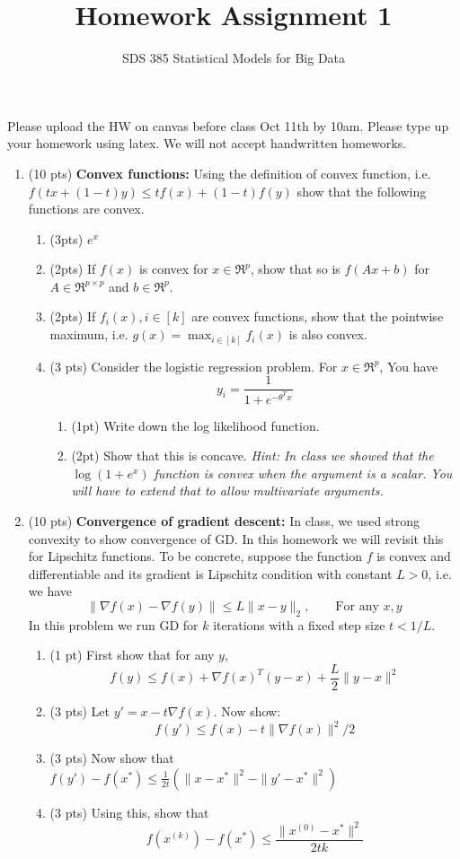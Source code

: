 \documentclass[11pt]{article}
\newcommand{\bi}{\begin{enumerate}}
\newcommand{\ib}{\end{enumerate}}
\newcommand{\p}{\item}
\begin{document}
\title{{\bf Homework Assignment 1}}
\author{SDS 385 Statistical Models for Big Data}

\date{}

\maketitle{}
Please upload the HW on canvas before class Oct 11th by 10am. Please type up your homework using latex. We will not accept handwritten homeworks. 
\begin{enumerate}%
\item (10 pts) \textbf{Convex functions: } Using the definition of convex function, i.e. $f(tx+(1-t)y)\leq tf(x)+(1-t)f(y)$ show that the following functions are convex.
\bi
\p (3pts) $e^x$
\p (2pts) If $f(x)$ is convex for $x\in\Re^p$, show that so is $f(Ax+b)$ for $A\in \Re^{p\times p}$ and $b\in \Re^p$.
\p (2pts) If $f_i(x),i\in[k]$ are convex functions, show that the pointwise maximum, i.e. $g(x)=\max_{i\in[k]}f_i(x)$ is also convex.
\p (3 pts) Consider the logistic regression problem. For $x\in \Re^p$, You have
$$y_i=\frac{1}{1+e^{-\theta^T x}}$$

\bi
\p (1pt) Write down the log likelihood function.
\p (2pt) Show that this is concave.
\textit{Hint: In class we showed that the $\log(1+e^x)$ function is convex when the argument is a scalar. You will have to extend that to allow multivariate arguments.}
\ib

\ib
\item (10 pts) \textbf{Convergence of gradient descent:} In class, we used strong convexity to show convergence of GD. In this homework we will revisit this for Lipschitz functions. To be concrete, suppose the function $f$ is convex and differentiable and its gradient is Lipschitz condition with constant $L>0$, i.e. we have 
$$\|\nabla f(x)-\nabla f(y)\|\leq L\|x-y\|_2, \qquad \mbox{For any $x,y$}$$
In this problem we run GD for $k$ iterations with a fixed step size $t<1/L$.
\begin{enumerate} 
	\item (1 pt) First show that for any $y$,
	$$f(y)\leq f(x)+\nabla f(x)^T(y-x)+\frac{L}{2}\|y-x\|^2$$
	\item (3 pts) Let $y'=x-t\nabla f(x)$. Now show:
	$$f(y')\leq f(x)-t\|\nabla f(x)\|^2/2$$
	\item (3 pts) Now show that $f(y')-f(x^*)\leq \frac{1}{2t}(\|x-x^*\|^2-\|y'-x^*\|^2)$
	\item (3 pts) Using this, show that $$f(x^{(k)})-f(x^*)\leq \frac{\|x^{(0)}-x^*\|^2}{2tk}$$
\end{enumerate}


\end{enumerate}
\end{document}
